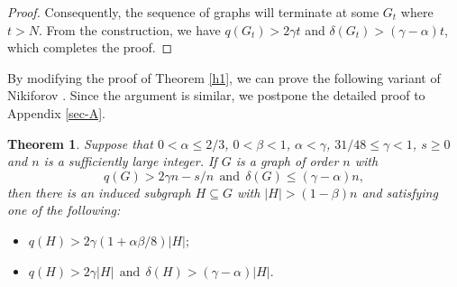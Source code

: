 \documentclass[11pt,a4paper]{article}
\theoremstyle{plain}
\newtheorem{theorem}{Theorem}[section]
\theoremstyle{definition}
\begin{document}
\begin{proof}
Consequently, the sequence of graphs will terminate at some $G_t$ where $t>N$. From the construction,
we have 
$q(G_{t})>2\gamma t$ and $\delta(G_{t})>(\gamma-\alpha)t$, which completes the proof. 
\end{proof}

 
By modifying the proof of Theorem \ref{h1}, we can prove the following variant of Nikiforov \cite[Theorem 5]{Nik2008-LAA}. 
Since the argument is similar, we postpone the detailed proof to Appendix \ref{sec-A}. 

\begin{theorem}\label{h1-two-cases}
Suppose that $0<\alpha\leq2/3$, $0<\beta<1$, $\alpha <\gamma$, $31/48\leq\gamma<1$,  $s\geq 0$ and $n$ is a sufficiently large integer. If $G$ is a graph of order $n$ with
$$q(G)>2\gamma n-s/n~~\mbox{and}~~\delta(G)\leq(\gamma-\alpha)n,$$
then there is an induced subgraph $H\subseteq G$ with $|H|>(1-\beta) n$ and  satisfying
one of the following:
\begin{itemize}
\item[\rm (i)]
$q(H)>2\gamma(1+\alpha\beta/8)|H|;$
\item[\rm (ii)]
$q(H)>2\gamma |H|~~\mbox{and}~~\delta(H)>(\gamma-\alpha)|H|.$
\end{itemize}
\end{theorem}
\end{document}
